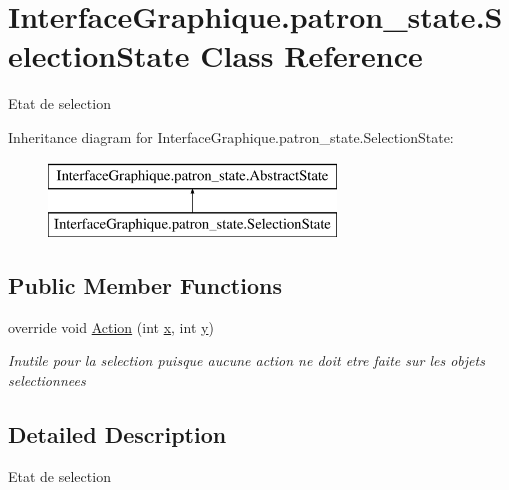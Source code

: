 \hypertarget{class_interface_graphique_1_1patron__state_1_1_selection_state}{\section{Interface\-Graphique.\-patron\-\_\-state.\-Selection\-State Class Reference}
\label{class_interface_graphique_1_1patron__state_1_1_selection_state}
}


Etat de selection  


Inheritance diagram for Interface\-Graphique.\-patron\-\_\-state.\-Selection\-State\-:\begin{figure}[H]
\begin{center}
\leavevmode
\includegraphics[height=2.000000cm]{class_interface_graphique_1_1patron__state_1_1_selection_state}
\end{center}
\end{figure}
\subsection*{Public Member Functions}
\begin{DoxyCompactItemize}
\item 
override void \hyperlink{class_interface_graphique_1_1patron__state_1_1_selection_state_a3c9a95b047d8ef642d0ac7662347f65e}{Action} (int \hyperlink{group__inf2990_ga6150e0515f7202e2fb518f7206ed97dc}{x}, int \hyperlink{group__inf2990_ga0a2f84ed7838f07779ae24c5a9086d33}{y})
\begin{DoxyCompactList}\small\item\em Inutile pour la selection puisque aucune action ne doit etre faite sur les objets selectionnees \end{DoxyCompactList}\end{DoxyCompactItemize}


\subsection{Detailed Description}
Etat de selection 



